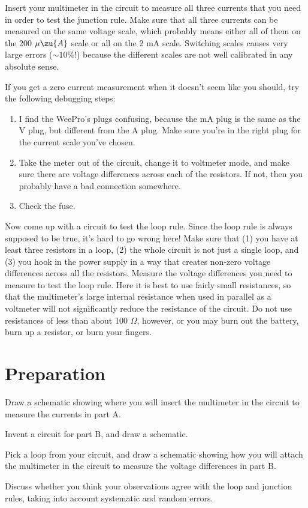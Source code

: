 
Insert your multimeter
in the circuit to measure all three currents that you need
in order to test the junction rule. Make sure that all three currents
can be measured on the same voltage scale, which probably means either
all of them on the 200 $\mu\zu{A}$ scale or all on the 2 mA scale.
Switching scales causes very large errors ($\sim10$\%!) because
the different scales are not well calibrated in any absolute sense.

If you get a zero current measurement when it doesn't seem like you
should, try the following debugging steps:

\begin{enumerate}
\item I find the WeePro's plugs confusing, because the mA plug is the same
as the V plug, but different from the A plug. Make sure you're in the right
plug for the current scale you've chosen.

\item Take the meter out of the circuit, change it to voltmeter mode, and
make sure there are voltage differences across each of the resistors. If not,
then you probably have a bad connection somewhere.

\item Check the fuse.
\end{enumerate}


Now come up with a circuit to test the loop rule. Since the
loop rule is always supposed to be true, it's hard to go
wrong here! Make sure that (1) you have at least three resistors in a
loop, (2) the whole circuit is not just a single loop,
and (3) you hook in the power supply in a way
that creates non-zero voltage differences across all the
resistors. Measure the voltage differences you need to
measure to test the loop rule. Here it is best to use fairly
small resistances, so that the multimeter's large internal
resistance when used in parallel as a voltmeter will not
significantly reduce the resistance of the circuit. Do not
use resistances of less than about 100 $\Omega $, however,
or you may burn out the battery, burn up a resistor, or burn your fingers.

\section*{Preparation}

Draw a schematic showing where you will insert the
multimeter in the circuit to measure the currents in part A.

Invent a circuit for part B, and draw a schematic.

Pick a loop from your circuit, and
draw a schematic showing how you will attach the
multimeter in the circuit to measure the voltage differences in part B.

\analysis

Discuss whether you think your observations agree with
the loop and junction rules, taking into account systematic and random errors.

